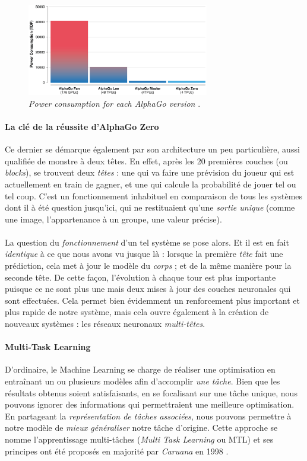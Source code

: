 \begin{figure}[ht]
    \centering
    \includegraphics[width=300px]{chapters/03/images/alphago-consumption.png}
    \caption{\label{comparatif}\emph{Power consumption for each AlphaGo version} \cite{AlphaGo2}.}
\end{figure}

\paragraph{La clé de la réussite d'AlphaGo Zero} Ce dernier se démarque également par son architecture un peu particulière,
aussi qualifiée de \guillemotleft monstre à deux têtes\guillemotright \cite{AlphaGo3}. En effet, après les 20 premières
couches (ou \emph{blocks}), se trouvent deux \emph{têtes} : une qui va faire une prévision du joueur qui est actuellement
en train de gagner, et une qui calcule la probabilité de jouer tel ou tel coup. C'est un fonctionnement inhabituel en comparaison de tous
les systèmes dont il à été question jusqu'ici, qui ne restituaient qu'une \emph{sortie unique} (comme une image, l'appartenance
à un groupe, une valeur précise).

\paragraph{} La question du \emph{fonctionnement} d'un tel système se pose alors. Et il est en fait \emph{identique}
à ce que nous avons vu jusque là : lorsque la première \emph{tête} fait une prédiction, cela met à jour le modèle
du \emph{corps} ; et de la même manière pour la seconde tête. De cette façon, l'évolution à chaque tour est plus importante
puisque ce ne sont plus une mais deux mises à jour des couches neuronales qui sont effectuées. Cela permet bien évidemment
un renforcement plus important et plus rapide de notre système, mais cela ouvre également à la création de nouveaux systèmes :
les réseaux neuronaux \emph{multi-têtes}.

\paragraph{Multi-Task Learning} D'ordinaire, le Machine Learning se charge de réaliser une optimisation
en entraînant un ou plusieurs modèles afin d'accomplir \emph{une tâche}. Bien que les résultats obtenus soient satisfaisants, en se 
focalisant sur une tâche unique, nous pouvons ignorer des informations qui permettraient une meilleure optimisation. En partageant la 
\emph{représentation de tâches associées}, nous pouvons permettre à notre modèle de \emph{mieux généraliser} notre tâche d'origine.
Cette approche se nomme l'apprentissage multi-tâches (\emph{Multi Task Learning} ou MTL) et ses principes ont été proposés en majorité 
par \emph{Caruana} en 1998 \cite{NeuralNets1}.


